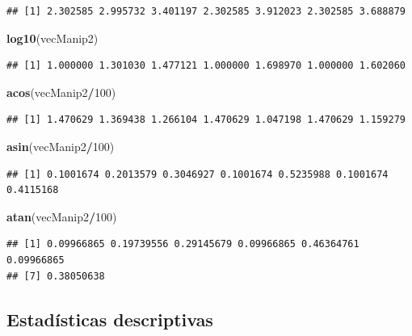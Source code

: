 \documentclass[]{book}
\newenvironment{Shaded}{\begin{snugshade}}{\end{snugshade}}
\newcommand{\KeywordTok}[1]{\textcolor[rgb]{0.13,0.29,0.53}{\textbf{#1}}}
\newcommand{\DecValTok}[1]{\textcolor[rgb]{0.00,0.00,0.81}{#1}}
\newcommand{\OperatorTok}[1]{\textcolor[rgb]{0.81,0.36,0.00}{\textbf{#1}}}
\newcommand{\NormalTok}[1]{#1}
\begin{document}
\begin{verbatim}
## [1] 2.302585 2.995732 3.401197 2.302585 3.912023 2.302585 3.688879
\end{verbatim}

\begin{Shaded}
\begin{Highlighting}[]
\KeywordTok{log10}\NormalTok{(vecManip2)}
\end{Highlighting}
\end{Shaded}

\begin{verbatim}
## [1] 1.000000 1.301030 1.477121 1.000000 1.698970 1.000000 1.602060
\end{verbatim}

\begin{Shaded}
\begin{Highlighting}[]
\KeywordTok{acos}\NormalTok{(vecManip2}\OperatorTok{/}\DecValTok{100}\NormalTok{)}
\end{Highlighting}
\end{Shaded}

\begin{verbatim}
## [1] 1.470629 1.369438 1.266104 1.470629 1.047198 1.470629 1.159279
\end{verbatim}

\begin{Shaded}
\begin{Highlighting}[]
\KeywordTok{asin}\NormalTok{(vecManip2}\OperatorTok{/}\DecValTok{100}\NormalTok{)}
\end{Highlighting}
\end{Shaded}

\begin{verbatim}
## [1] 0.1001674 0.2013579 0.3046927 0.1001674 0.5235988 0.1001674 0.4115168
\end{verbatim}

\begin{Shaded}
\begin{Highlighting}[]
\KeywordTok{atan}\NormalTok{(vecManip2}\OperatorTok{/}\DecValTok{100}\NormalTok{)}
\end{Highlighting}
\end{Shaded}

\begin{verbatim}
## [1] 0.09966865 0.19739556 0.29145679 0.09966865 0.46364761 0.09966865
## [7] 0.38050638
\end{verbatim}

\subsection{Estadísticas descriptivas}\label{estadisticas-descriptivas}
\end{document}
